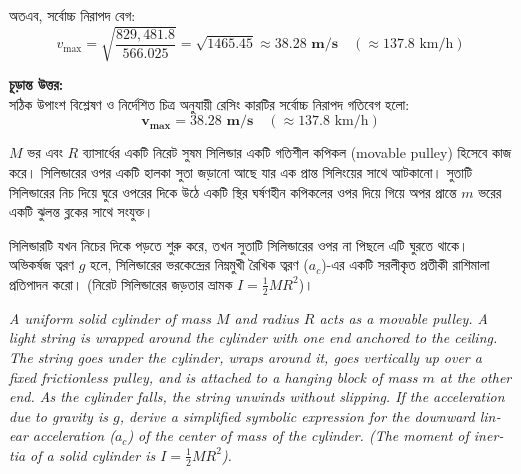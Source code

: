 \documentclass[12pt, a4paper]{article}
\begin{document}
\begin{tcolorbox}[solutionbox={সমাধান (Solution)}]
অতএব, সর্বোচ্চ নিরাপদ বেগ:
$$v_{\text{max}} = \sqrt{\frac{829,481.8}{566.025}} = \sqrt{1465.45} \approx \mathbf{38.28\text{ m/s}} \quad (\approx 137.8\text{ km/h})$$

\vspace{1em}
\begin{tcolorbox}[answerbox]
\textbf{চূড়ান্ত উত্তর:} \\
সঠিক উপাংশ বিশ্লেষণ ও নির্দেশিত চিত্র অনুযায়ী রেসিং কারটির সর্বোচ্চ নিরাপদ গতিবেগ হলো:
\[ \mathbf{v_{\text{max}} = 38.28\text{ m/s}} \quad (\approx 137.8\text{ km/h}) \]
\end{tcolorbox}
\end{tcolorbox}

\begin{tcolorbox}[questionbox={প্রশ্ন (Question) 13}]
\noindent
$M$ ভর এবং $R$ ব্যাসার্ধের একটি নিরেট সুষম সিলিন্ডার একটি গতিশীল কপিকল (movable pulley) হিসেবে কাজ করে। সিলিন্ডারের ওপর একটি হালকা সুতা জড়ানো আছে যার এক প্রান্ত সিলিংয়ের সাথে আটকানো। সুতাটি সিলিন্ডারের নিচ দিয়ে ঘুরে ওপরের দিকে উঠে একটি স্থির ঘর্ষণহীন কপিকলের ওপর দিয়ে গিয়ে অপর প্রান্তে $m$ ভরের একটি ঝুলন্ত ব্লকের সাথে সংযুক্ত। 

\vspace{0.3em}
\noindent
সিলিন্ডারটি যখন নিচের দিকে পড়তে শুরু করে, তখন সুতাটি সিলিন্ডারের ওপর না পিছলে এটি ঘুরতে থাকে। অভিকর্ষজ ত্বরণ $g$ হলে, সিলিন্ডারের ভরকেন্দ্রের নিম্নমুখী রৈখিক ত্বরণ ($a_c$)-এর একটি সরলীকৃত প্রতীকী রাশিমালা প্রতিপাদন করো। (নিরেট সিলিন্ডারের জড়তার ভ্রামক $I = \frac{1}{2}MR^2$)।

\vspace{0.8em}
\begin{english}
\noindent\textit{\color{darkgray}
A uniform solid cylinder of mass $M$ and radius $R$ acts as a movable pulley. A light string is wrapped around the cylinder with one end anchored to the ceiling. The string goes under the cylinder, wraps around it, goes vertically up over a fixed frictionless pulley, and is attached to a hanging block of mass $m$ at the other end. As the cylinder falls, the string unwinds without slipping. If the acceleration due to gravity is $g$, derive a simplified symbolic expression for the downward linear acceleration ($a_c$) of the center of mass of the cylinder. (The moment of inertia of a solid cylinder is $I = \frac{1}{2}MR^2$).
}
\end{english}
\end{tcolorbox}
\end{document}
